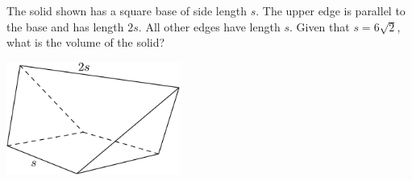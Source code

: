 The solid shown has a square base of side length $s$.  The upper edge is parallel to the base and has length $2s$.  All other edges have length $s$.  Given that $s = 6 \sqrt{2}$, what is the volume of the solid?
\begin{center}
\includegraphics[width = 57.0mm]{img/fig0.png}
\end{center}